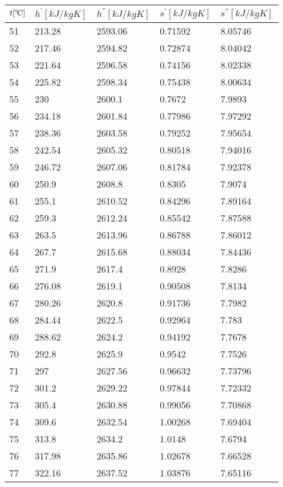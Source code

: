 \documentclass[twocolumn]{article}
\begin{document}
\begin{tabular}{l|l|l|l|l}
	$t [\text{\textcelsius}] $ & $h^{'} [kJ/kg K]$ & $h^{''} [kJ/kg K]$ & $s^{'} [kJ/kg K] $ & $s^{''} [kJ/kg K]$ \\ \hline
51	&	213.28	&	2593.06	&	0.71592	&	8.05746 \\ \hline
52	&	217.46	&	2594.82	&	0.72874	&	8.04042 \\ \hline
53	&	221.64	&	2596.58	&	0.74156	&	8.02338 \\ \hline
54	&	225.82	&	2598.34	&	0.75438	&	8.00634 \\ \hline
55	&	230	&	2600.1	&	0.7672	&	7.9893 \\ \hline
56	&	234.18	&	2601.84	&	0.77986	&	7.97292 \\ \hline
57	&	238.36	&	2603.58	&	0.79252	&	7.95654 \\ \hline
58	&	242.54	&	2605.32	&	0.80518	&	7.94016 \\ \hline
59	&	246.72	&	2607.06	&	0.81784	&	7.92378 \\ \hline
60	&	250.9	&	2608.8	&	0.8305	&	7.9074 \\ \hline
61	&	255.1	&	2610.52	&	0.84296	&	7.89164 \\ \hline
62	&	259.3	&	2612.24	&	0.85542	&	7.87588 \\ \hline
63	&	263.5	&	2613.96	&	0.86788	&	7.86012 \\ \hline
64	&	267.7	&	2615.68	&	0.88034	&	7.84436 \\ \hline
65	&	271.9	&	2617.4	&	0.8928	&	7.8286 \\ \hline
66	&	276.08	&	2619.1	&	0.90508	&	7.8134 \\ \hline
67	&	280.26	&	2620.8	&	0.91736	&	7.7982 \\ \hline
68	&	284.44	&	2622.5	&	0.92964	&	7.783 \\ \hline
69	&	288.62	&	2624.2	&	0.94192	&	7.7678 \\ \hline
70	&	292.8	&	2625.9	&	0.9542	&	7.7526 \\ \hline
71	&	297	&	2627.56	&	0.96632	&	7.73796 \\ \hline
72	&	301.2	&	2629.22	&	0.97844	&	7.72332 \\ \hline
73	&	305.4	&	2630.88	&	0.99056	&	7.70868 \\ \hline
74	&	309.6	&	2632.54	&	1.00268	&	7.69404 \\ \hline
75	&	313.8	&	2634.2	&	1.0148	&	7.6794 \\ \hline
76	&	317.98	&	2635.86	&	1.02678	&	7.66528 \\ \hline
77	&	322.16	&	2637.52	&	1.03876	&	7.65116 \\ \hline

\end{tabular}
\end{document}
